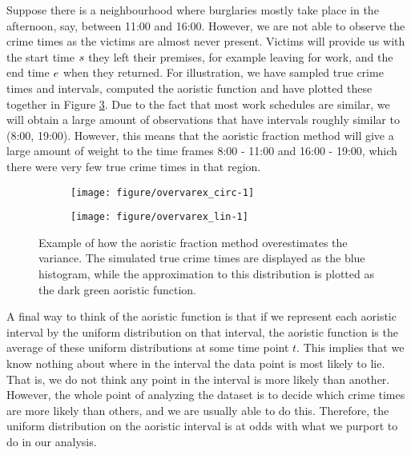 Suppose there is a neighbourhood where burglaries mostly take place in the afternoon, say, between 11:00 and 16:00. However, we are not able to observe the crime times as the victims are almost never present. Victims will provide us with the start time $s$ they left their premises, for example leaving for work, and the end time $e$ when they returned. For illustration, we have sampled true crime times and intervals, computed the aoristic function and have plotted these together in Figure \ref{overvarex}. Due to the fact that most work schedules are similar, we will obtain a large amount of observations that have intervals roughly similar to (8:00, 19:00). However, this means that the aoristic fraction method will give a large amount of weight to the time frames 8:00 - 11:00 and 16:00 - 19:00, which there were very few true crime times in that region.

\begin{figure}
\centering
\begin{subfigure}[b]{0.5\linewidth}
\centering
\begin{knitrout}
\color{fgcolor}
\texttt{[image: figure/overvarex\_circ-1]} 

\end{knitrout}
\caption{} \label{overvarex_circ}
\end{subfigure}%
\begin{subfigure}[b]{0.5\linewidth}
\centering
\vfill
\begin{knitrout}
\color{fgcolor}
\texttt{[image: figure/overvarex\_lin-1]} 

\end{knitrout}
\caption{} \label{overvarex_lin}
\end{subfigure}%
\caption{Example of how the aoristic fraction method overestimates the variance. The simulated true crime times are displayed as the blue histogram, while the approximation to this distribution is plotted as the dark green aoristic function.} \label{overvarex}
\end{figure}

A final way to think of the aoristic function is that if we represent each aoristic interval by the uniform distribution on that interval, the aoristic function is the average of these uniform distributions at some time point $t$. This implies that we know nothing about where in the interval the data point is most likely to lie. That is, we do not think any point in the interval is more likely than another. However, the whole point of analyzing the dataset is to decide which crime times are more likely than others, and we are usually able to do this. Therefore, the uniform distribution on the aoristic interval is at odds with what we purport to do in our analysis.

